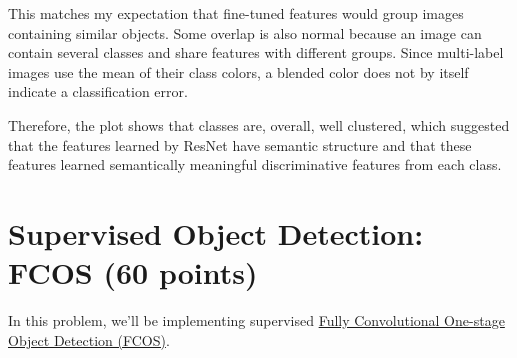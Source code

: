 \begin{itemize}
\begin{itemize}
\begin{solution}
This matches my expectation that fine-tuned features would group images
containing similar objects. Some overlap is also normal because an image
can contain several classes and share features with different groups.
Since multi-label images use the mean of their class colors, a blended color
does not by itself indicate a classification error.

Therefore, the plot shows that classes are, overall, well clustered, which suggested that the features learned by ResNet have semantic structure and that these features learned semantically meaningful discriminative features from each class.
\end{solution}
        
    \end{itemize}
\end{itemize}

\clearpage
\section{Supervised Object Detection: FCOS (60 points)}
In this problem, we'll be implementing supervised {\href{https://arxiv.org/abs/1904.01355}{Fully Convolutional One-stage Object Detection (FCOS)}}. 

